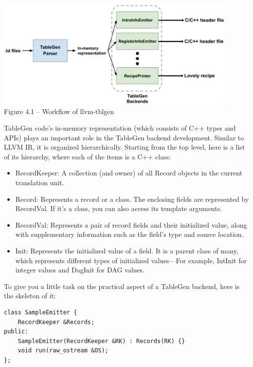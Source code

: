 \hspace*{\fill} \\ %
\begin{center}
\includegraphics[width=0.9\textwidth]{content/1/chapter4/images/1.jpg}\\
Figure 4.1 – Workflow of llvm-tblgen
\end{center}

TableGen code's in-memory representation (which consists of C++ types and APIs) plays an important role in the TableGen backend development. Similar to LLVM IR, it is organized hierarchically. Starting from the top level, here is a list of its hierarchy, where each of the items is a C++ class:

\begin{itemize}
\item RecordKeeper: A collection (and owner) of all Record objects in the current translation unit.
\item Record: Represents a record or a class. The enclosing fields are represented by RecordVal. If it's a class, you can also access its template arguments.
\item RecordVal: Represents a pair of record fields and their initialized value, along with supplementary information such as the field's type and source location.
\item Init: Represents the initialized value of a field. It is a parent class of many, which represents different types of initialized values—For example, IntInit for integer values and DagInit for DAG values.
\end{itemize}

To give you a little task on the practical aspect of a TableGen backend, here is the skeleton of it:

\begin{lstlisting}[style=styleCXX]
class SampleEmitter {
	RecordKeeper &Records;
public:
	SampleEmitter(RecordKeeper &RK) : Records(RK) {}
	void run(raw_ostream &OS);
};
\end{lstlisting}

